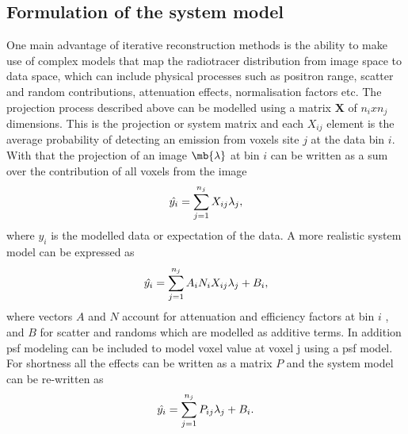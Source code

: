 \subsection{Formulation of the system model}
One main advantage of iterative reconstruction methods is the ability to make use of complex models that map the radiotracer distribution from image space to data space, which can include physical processes such as positron range, scatter and random contributions, attenuation effects, normalisation factors etc.
The projection process described above can be modelled using a matrix $\bm{X}$ of $n_ixn_j$ dimensions. This is the projection or system matrix and each ${X}_{ij}$ element is the average probability of detecting an emission from voxels site $j$ at the data bin $i$. With that the projection of an image $\mb{\lambda}$ at bin $i$ can be written as a sum over the contribution of all voxels from the image
\begin{equation}
   \hat{y_i} = \sum_{j=1}^{n_j} X_{ij} \lambda_j  \\,
\end{equation}
where $\hat{y_i}$ is the modelled data or expectation of the data.  A more realistic system model can be expressed as 
\begin{equation}
   \hat{y_i} = \sum_{j=1}^{n_j} A_{i}N_{i}X_{ij} \lambda_j + B_{i} \\,
\end{equation}
where vectors $A$ and $N$ account for attenuation and efficiency factors at bin $i$ , and $B$ for scatter and randoms which are modelled as additive terms. In addition \gls{psf} modeling can be included to model voxel value at voxel j using a \gls{psf} model. 
For shortness all the effects can be written as a matrix $P$ and the system model can be re-written as
\begin{equation}
   \hat{y_i} = \sum_{j=1}^{n_j} P_{ij} \lambda_j + B_{i} \\.
   \label{eqn:system_model}
\end{equation}

